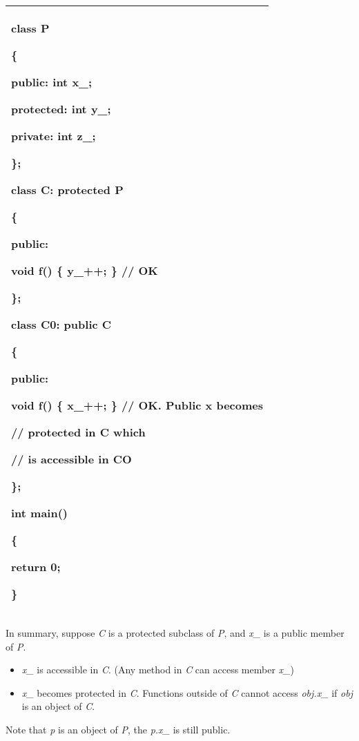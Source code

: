 \documentclass[
]{article}
\providecommand{\tightlist}{%
  \setlength{\itemsep}{0pt}\setlength{\parskip}{0pt}}
\begin{document}
\begin{longtable}[]{@{}l@{}}
\toprule
\endhead
\begin{minipage}[t]{0.97\columnwidth}\raggedright
class P

\{

public: int x\_;

protected: int y\_;

private: int z\_;

\};

class C: \textbf{protected P}

\{

public:

void f() \{ y\_++; \} // OK

\};

class C0: public C

\{

public:

void f() \{ \textbf{x\_++;} \} // OK. Public x becomes

// protected in C which

// is accessible in CO

\};

int main()

\{

return 0;

\}\strut
\end{minipage}\tabularnewline
\bottomrule
\end{longtable}

In summary, suppose \emph{C} is a protected subclass of \emph{P}, and
\emph{x\_} is a public member of \emph{P}.

\begin{itemize}
\tightlist
\item
  \emph{x\_} is accessible in \emph{C}. (Any method in \emph{C} can
  access member \emph{x\_})
\item
  \emph{x\_} becomes protected in \emph{C}. Functions outside of
  \emph{C} cannot access \emph{obj.x\_} if \emph{obj} is an object of
  \emph{C}.
\end{itemize}

Note that \emph{p} is an object of \emph{P}, the \emph{p.x\_} is still
public.
\end{document}

